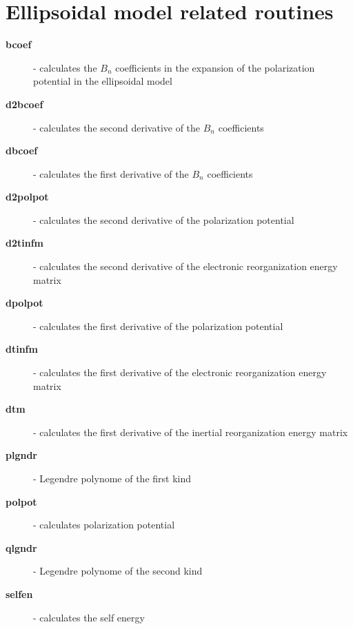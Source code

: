 \documentclass[oneside,11pt,openany]{book}
\newcommand{\tw}{\ttfamily}
\begin{document}
\section{Ellipsoidal model related routines}
\begin{description}
\item[{\tw\bf bcoef}] - calculates the $B_n$ coefficients in the
                     expansion of the polarization potential
                     in the ellipsoidal model
\item[{\tw\bf d2bcoef}] - calculates the second derivative of the
                       $B_n$ coefficients
\item[{\tw\bf dbcoef}] - calculates the first derivative of the
                       $B_n$ coefficients
\item[{\tw\bf d2polpot}] - calculates the second derivative of the
                        polarization potential
\item[{\tw\bf d2tinfm}] - calculates the second derivative of the
                       electronic reorganization energy matrix
\item[{\tw\bf dpolpot}] - calculates the first derivative of the
                       polarization potential
\item[{\tw\bf dtinfm}] - calculates the first derivative of the
                      electronic reorganization energy matrix
\item[{\tw\bf dtm}] - calculates the first derivative of the
                   inertial reorganization energy matrix
\item[{\tw\bf plgndr}] - Legendre polynome of the first kind
\item[{\tw\bf polpot}] - calculates polarization potential
\item[{\tw\bf qlgndr}] - Legendre polynome of the second kind
\item[{\tw\bf selfen}] - calculates the self energy
\end{description}

%
\end{document}
